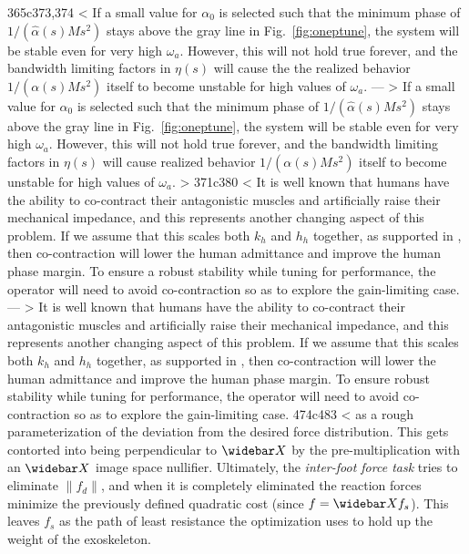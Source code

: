 365c373,374
< If a small value for $\alpha_0$ is selected such that the minimum phase of $1/(\widehat\alpha(s)Ms^2)$ stays above the gray line in Fig.~\ref{fig:oneptune}, the system will be stable even for very high $\omega_a$. However, this will not hold true forever, and the bandwidth limiting factors in $\eta(s)$ will cause the the realized behavior $1/(\alpha(s)Ms^2)$ itself to become unstable for high values of $\omega_a$. 
---
> If a small value for $\alpha_0$ is selected such that the minimum phase of $1/(\widehat\alpha(s)Ms^2)$ stays above the gray line in Fig.~\ref{fig:oneptune}, the system will be stable even for very high $\omega_a$. However, this will not hold true forever, and the bandwidth limiting factors in $\eta(s)$ will cause  realized behavior $1/(\alpha(s)Ms^2)$ itself to become unstable for high values of $\omega_a$.
> 
371c380
< It is well known that humans have the ability to co-contract their antagonistic muscles and artificially raise their mechanical impedance, and this represents another changing aspect of this problem. If we assume that this scales both $k_h$ and $h_h$ together, as supported in \cite{HeHuangThomasSentis2020TNSRE}, then co-contraction will lower the human admittance and improve the human phase margin. To ensure a robust stability while tuning for performance, the operator will need to avoid co-contraction so as to explore the gain-limiting case.
---
> It is well known that humans have the ability to co-contract their antagonistic muscles and artificially raise their mechanical impedance, and this represents another changing aspect of this problem. If we assume that this scales both $k_h$ and $h_h$ together, as supported in \cite{HeHuangThomasSentis2020TNSRE}, then co-contraction will lower the human admittance and improve the human phase margin.  To ensure robust stability while tuning for performance, the operator will need to avoid co-contraction so as to explore the gain-limiting case. 
474c483
< as a rough parameterization of the deviation from the desired force distribution. This gets contorted into being perpendicular to $\widebar X$ by the pre-multiplication with an $\widebar X$ image space nullifier. Ultimately, the \emph{inter-foot force task} tries to eliminate $\|f_d\|$, and when it is completely eliminated the reaction forces minimize the previously defined quadratic cost (since $f = \widebar X f_s$). This leaves $f_s$ as the path of least resistance the optimization uses to hold up the weight of the exoskeleton.

